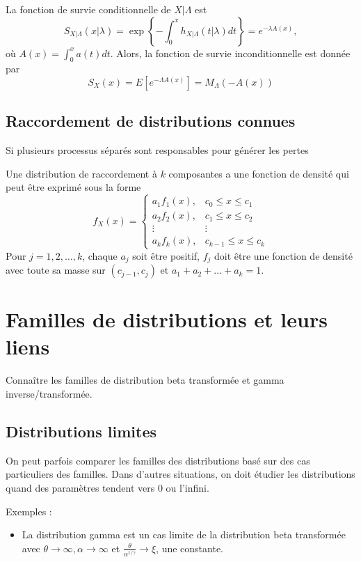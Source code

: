 La fonction de survie conditionnelle de $X\vert \Lambda$ est 
$$S_{X\vert\Lambda}(x\vert\lambda) = \exp\left\{-\int_{0}^{x}h_{X\vert\Lambda}(t\vert\lambda)dt\right\} = e^{-\lambda A(x)},$$
où $A(x) = \int_{0}^{x}a(t) dt$. Alors, la fonction de survie inconditionnelle est donnée par 
$$S_{X}(x) = E\left[e^{-\Lambda A(x)}\right] = M_{\Lambda}(-A(x))$$

\subsection{Raccordement de distributions connues}

Si plusieurs processus séparés sont responsables pour générer les pertes

\begin{definition}{}{}
	Une distribution de raccordement à $k$ composantes a une fonction de densité qui peut être exprimé sous la forme
	$$f_{X}(x) = \begin{cases}
	a_1 f_{1}(x), & c_0 \leq x \leq c_1\\
	a_2 f_{2}(x), & c_1 \leq x \leq c_2\\
	\vdots & \vdots\\
	a_k f_{k}(x), & c_{k-1} \leq x \leq c_k
	\end{cases}$$
	Pour $j = 1, 2, \dots, k$, chaque $a_j$ soit être positif, $f_{j}$ doit être une fonction de densité avec toute sa masse sur $(c_{j-1}, c_j)$ et $a_1 + a_2 + \dots + a_k = 1$.
\end{definition}

\section{Familles de distributions et leurs liens}

Connaître les familles de distribution beta transformée et gamma inverse/transformée.

\subsection{Distributions limites}

On peut parfois comparer les familles des distributions basé sur des cas particuliers des familles. Dans d'autres situations, on doit étudier les distributions quand des paramètres tendent vers 0 ou l'infini.

Exemples : 

\begin{itemize}
	\item La distribution gamma est un cas limite de la distribution beta transformée avec $\theta \to \infty, \alpha \to \infty$ et $\frac{\theta}{\alpha^{1/\gamma}} \to \xi$, une constante. 
\end{itemize}

